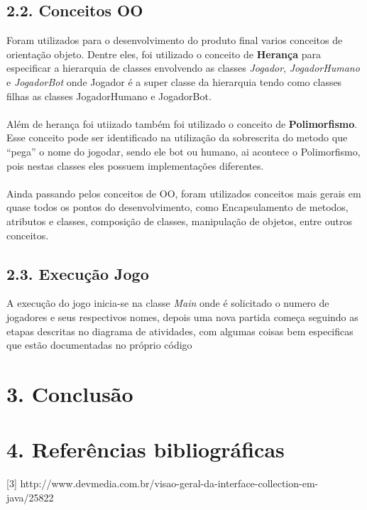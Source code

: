 \documentclass[12pt, a4paper]{article}
\begin{document}
   \subsection*{2.2. Conceitos OO}
    Foram utilizados para o desenvolvimento do produto final varios conceitos de orientação objeto.
    Dentre eles, foi utilizado o conceito de \textbf{Herança} para especificar a hierarquia de classes envolvendo as classes
    \textit{Jogador}, \textit{JogadorHumano} e \textit{JogadorBot} onde Jogador é a super classe da hierarquia tendo como classes filhas as classes
    JogadorHumano e JogadorBot. \\\\
    Além de herança foi utiizado também foi utilizado o conceito de \textbf{Polimorfismo}. Esse conceito pode ser identificado na utilização da 
    sobrescrita do metodo que ``pega'' o nome do jogodar, sendo ele bot ou humano, ai acontece o Polimorfismo, pois nestas classes eles possuem
    implementações diferentes.\\\\
    Ainda passando pelos conceitos de OO, foram utilizados conceitos mais gerais em quase todos os pontos do desenvolvimento, como Encapsulamento de
    metodos, atributos e classes, composição de classes, manipulação de objetos, entre outros conceitos.

   \subsection*{2.3. Execução Jogo}
    A execução do jogo inicia-se na classe \textit{Main} onde é solicitado o numero de jogadores e seus respectivos nomes, depois uma nova
    partida começa seguindo as etapas descritas no diagrama de atividades, com algumas coisas bem especificas que estão documentadas no próprio código

\section*{3. Conclusão}


\section*{4. Referências bibliográficas}
[3] http://www.devmedia.com.br/visao-geral-da-interface-collection-em-java/25822
\end{document}
